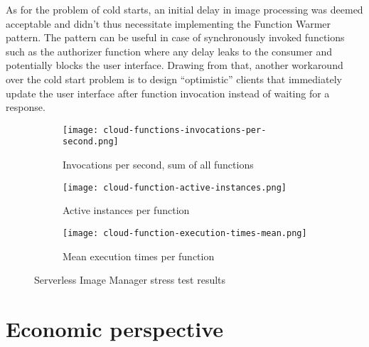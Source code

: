 As for the problem of cold starts, an initial delay in image processing was deemed acceptable and didn't thus necessitate implementing the Function Warmer pattern. The pattern can be useful in case of synchronously invoked functions such as the authorizer function where any delay leaks to the consumer and potentially blocks the user interface. Drawing from that, another workaround over the cold start problem is to design ``optimistic'' clients that immediately update the user interface after function invocation instead of waiting for a response.



\begin{figure}
  \centering
  \begin{subfigure}[b]{0.9\textwidth}
      \texttt{[image: cloud-functions-invocations-per-second.png]}
      \caption{Invocations per second, sum of all functions}
      \label{fig:tiger}
  \end{subfigure}

  \begin{subfigure}[b]{0.9\textwidth}
      \texttt{[image: cloud-function-active-instances.png]}
      \caption{Active instances per function}
      \label{fig:gull}
  \end{subfigure}

  \begin{subfigure}[b]{0.9\textwidth}
      \texttt{[image: cloud-function-execution-times-mean.png]}
      \caption{Mean execution times per function}
      \label{fig:mouse}
  \end{subfigure}
  \caption{Serverless Image Manager stress test results}\label{fig:serverlessStressTest}
\end{figure}

\section{Economic perspective}

